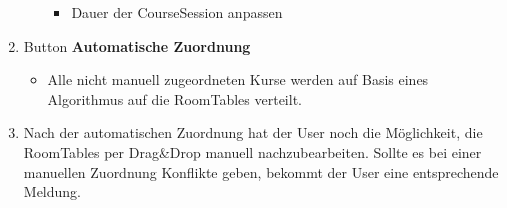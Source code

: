 \documentclass{article}
\begin{document}
\begin{enumerate}
\begin{itemize}
\begin{itemize}
				\item Dauer der CourseSession anpassen
			\end{itemize}
		\end{itemize}
		\item Button \textbf{Automatische Zuordnung}
		\begin{itemize}
			\item Alle nicht manuell zugeordneten Kurse werden auf Basis eines Algorithmus auf die RoomTables verteilt.
		\end{itemize}
		\item Nach der automatischen Zuordnung hat der User noch die Möglichkeit, die RoomTables per Drag\&Drop manuell nachzubearbeiten. Sollte es bei einer manuellen Zuordnung Konflikte geben, bekommt der User eine entsprechende Meldung.
	\end{enumerate}
\end{document}
